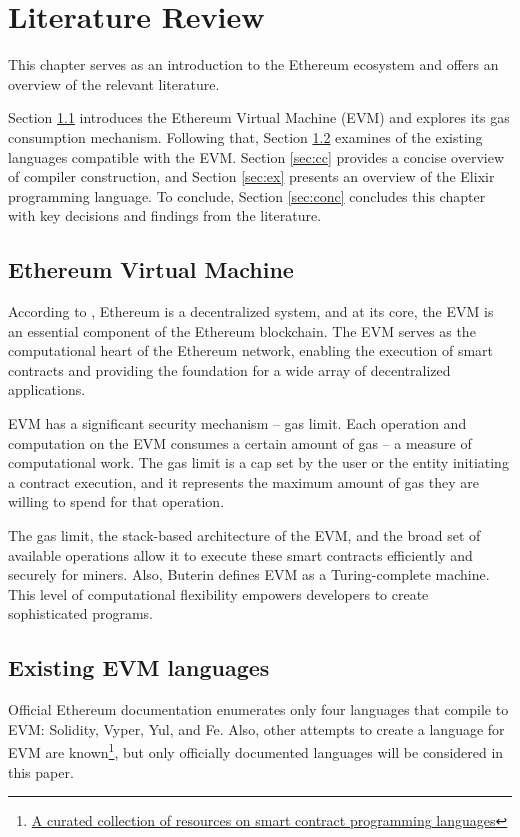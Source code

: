 \chapter{Literature Review}
\label{chap:lr}

This chapter serves as an introduction to the Ethereum ecosystem and offers an overview of the relevant literature.

Section \ref{sec:evm} introduces the Ethereum Virtual Machine (EVM) and explores its gas consumption mechanism. Following that, Section \ref{sec:langs} examines of the existing languages compatible with the EVM. Section \ref{sec:cc} provides a concise overview of compiler construction, and Section \ref{sec:ex} presents an overview of the Elixir programming language. To conclude, Section \ref{sec:conc} concludes this chapter with key decisions and findings from the literature.

\section{Ethereum Virtual Machine}
\label{sec:evm}
According to \cite{EthereumWhitepaper}, Ethereum is a decentralized system, and at its core, the EVM is an essential component of the Ethereum blockchain. The EVM serves as the computational heart of the Ethereum network, enabling the execution of smart contracts and providing the foundation for a wide array of decentralized applications.

EVM has a significant security mechanism -- gas limit. Each operation and computation on the EVM consumes a certain amount of gas -- a measure of computational work. The gas limit is a cap set by the user or the entity initiating a contract execution, and it represents the maximum amount of gas they are willing to spend for that operation.

The gas limit, the stack-based architecture of the EVM, and the broad set of available operations allow it to  execute these smart contracts efficiently and securely for miners. Also, Buterin \cite{EthereumWhitepaper} defines EVM as a Turing-complete machine. This level of computational flexibility empowers developers to create sophisticated programs.

\section{Existing EVM languages}
\label{sec:langs}
Official Ethereum documentation \cite{OfficialEthereumLanguages} enumerates only four languages that compile to EVM: Solidity, Vyper, Yul, and Fe. Also, other attempts to create a language for EVM are known\footnote{\href{https://github.com/s-tikhomirov/smart-contract-languages}{A curated collection of resources on smart contract programming languages}}, but only officially documented languages will be considered in this paper.

